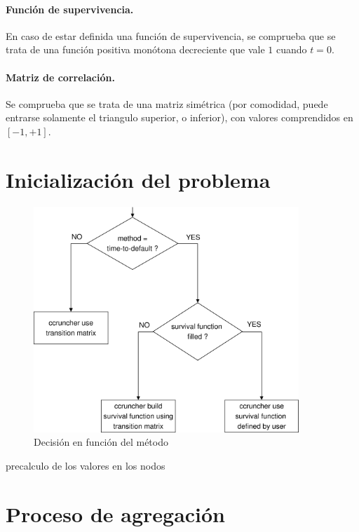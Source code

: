 \paragraph{Funci\'on de supervivencia.} En caso de estar definida
una funci\'on de supervivencia, se comprueba que se trata de una
funci\'on positiva mon\'otona decreciente que vale $1$ cuando $t=0$.

\paragraph{Matriz de correlaci\'on.} Se comprueba que se trata de
una matriz sim\'etrica (por comodidad, puede entrarse solamente
el triangulo superior, o inferior), con valores comprendidos
en $[-1,+1]$.


\section{Inicializaci\'on del problema}


\begin{figure}[!hb]
\begin{center}
\includegraphics[width=10cm,angle=0]{./images/decisiontree1.eps}
\caption{Decisi\'on en funci\'on del m\'etodo}
\label{decisiontree1}
\end{center}
\end{figure}

precalculo de los valores en los nodos


\section{Proceso de agregaci\'on}

